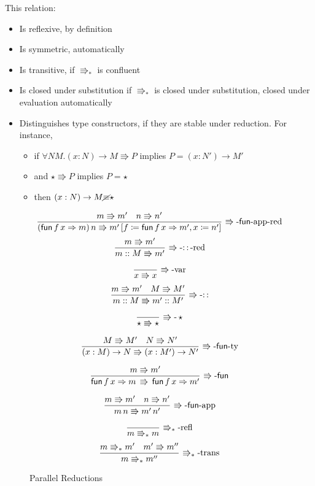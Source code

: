 This relation:
\begin{itemize}
\item Is reflexive, by definition
\item Is symmetric, automatically
\item Is transitive, if $\Rrightarrow_{\ast}$ is confluent
\item Is closed under substitution if $\Rrightarrow_{\ast}$ is closed under substitution, closed under evaluation automatically
\item Distinguishes type constructors, if they are stable under reduction.
For instance,
\begin{itemize}
\item if $\forall NM.\left(x:N\right)\rightarrow M\Rrightarrow P$ implies $P=\left(x:N'\right)\rightarrow M'$
\item and $\star\Rrightarrow P$ implies $P=\star$
\item then $\left(x:N\right)\rightarrow M\cancel{\equiv}\star$
\end{itemize}
\end{itemize}
\begin{figure}
\[
\frac{m\Rrightarrow m'\quad n\Rrightarrow n'}{\left(\mathsf{fun}\,f\,x\Rightarrow m\right)n\Rrightarrow m'\left[f\coloneqq\mathsf{fun}\,f\,x\Rightarrow m',x\coloneqq n'\right]}\,\operatorname{\Rrightarrow-\mathsf{fun}-app-red}
\]
\[
\frac{m\Rrightarrow m'}{m::M\Rrightarrow m'}\,\operatorname{\Rrightarrow-::-red}
\]
 
\[
\frac{\,}{x\Rrightarrow x}\,\operatorname{\Rrightarrow-var}
\]
\[
\frac{m\Rrightarrow m'\quad M\Rrightarrow M'}{m::M\Rrightarrow m'::M'}\,\operatorname{\Rrightarrow-::}
\]
 
\[
\frac{\,}{\star\Rrightarrow\star}\,\operatorname{\Rrightarrow-}\star
\]
 
\[
\frac{M\Rrightarrow M'\quad N\Rrightarrow N'}{\left(x:M\right)\rightarrow N\Rrightarrow\left(x:M'\right)\rightarrow N'}\,\operatorname{\Rrightarrow-\mathsf{fun}-ty}
\]
 
\[
\frac{m\Rrightarrow m'}{\mathsf{fun}\,f\,x\Rightarrow m\,\Rrightarrow\,\mathsf{fun}\,f\,x\Rightarrow m'}\,\operatorname{\Rrightarrow-\mathsf{fun}}
\]
 
\[
\frac{m\Rrightarrow m'\quad n\Rrightarrow n'}{m\,n\Rrightarrow m'\,n'}\,\operatorname{\Rrightarrow-\mathsf{fun}-app}
\]
 
\[
\frac{\,}{m\Rrightarrow_{\ast}m}\,\operatorname{\Rrightarrow_{\ast}-refl}
\]
\[
\frac{m\Rrightarrow_{\ast}m'\quad m'\Rrightarrow m''}{m\Rrightarrow_{\ast}m''}\,\operatorname{\Rrightarrow_{\ast}-trans}
\]
 
\caption{\SLang{} Parallel Reductions}
\label{fig:surface-reduction}
\end{figure}

